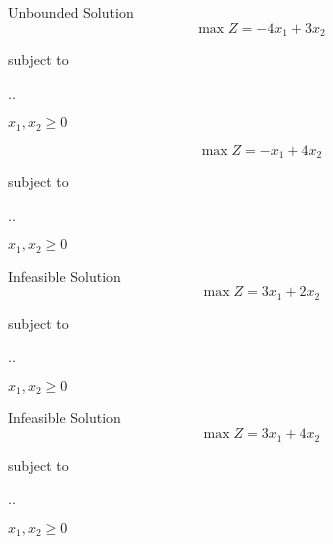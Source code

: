   \begin{frameExample}{Unbounded Solution}{}
    \[ \max Z = -4x_1 + 3x_2\]

    {\centering
      subject to

      \vspace{3mm}

      \sysdelim..%

      \vspace{3mm}
      $x_1, x_2 \geq 0$
    \par}
\end{frameExample}

  \begin{frameExample}{}{}
    \[ \max Z = -x_1 + 4x_2\]

    {\centering
      subject to

      \vspace{3mm}

      \sysdelim..%

      \vspace{3mm}
      $x_1, x_2 \geq 0$
    \par}
  \end{frameExample}

    \begin{frameExample}{Infeasible Solution}{}
    \[ \max Z = 3x_1 + 2x_2\]

    {\centering
      subject to

      \vspace{3mm}

      \sysdelim..%

      \vspace{3mm}
      $x_1, x_2 \geq 0$
    \par}
\end{frameExample}

    \begin{frameExample}{Infeasible Solution}{}
    \[ \max Z = 3x_1 + 4x_2\]

    {\centering
      subject to

      \vspace{3mm}

      \sysdelim..%

      \vspace{3mm}
      $x_1, x_2 \geq 0$
    \par}
  \end{frameExample}

